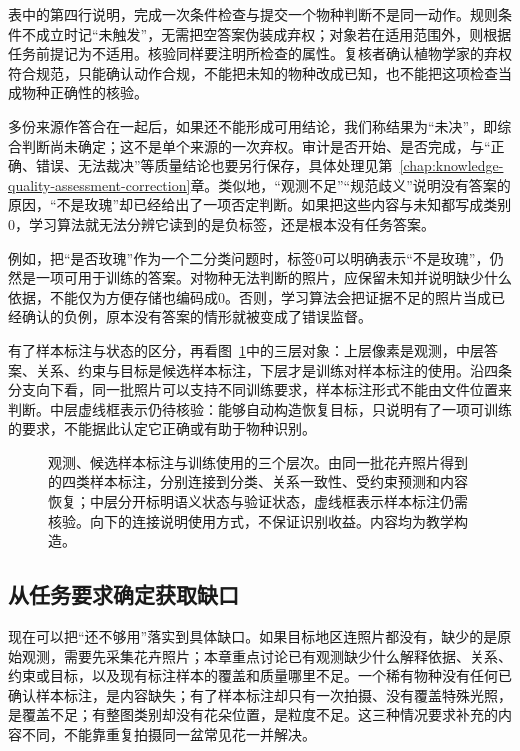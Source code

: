 表中的第四行说明，完成一次条件检查与提交一个物种判断不是同一动作。规则条件不成立时记“未触发”，无需把空答案伪装成弃权；对象若在适用范围外，则根据任务前提记为不适用。核验同样要注明所检查的属性。复核者确认植物学家的弃权符合规范，只能确认动作合规，不能把未知的物种改成已知，也不能把这项检查当成物种正确性的核验。

多份来源作答合在一起后，如果还不能形成可用结论，我们称结果为“未决”，即综合判断尚未确定；这不是单个来源的一次弃权。审计是否开始、是否完成，与“正确、错误、无法裁决”等质量结论也要另行保存，具体处理见第~\ref{chap:knowledge-quality-assessment-correction}章。类似地，“观测不足”“规范歧义”说明没有答案的原因，“不是玫瑰”却已经给出了一项否定判断。如果把这些内容与未知都写成类别0，学习算法就无法分辨它读到的是负标签，还是根本没有任务答案。

例如，把“是否玫瑰”作为一个二分类问题时，标签0可以明确表示“不是玫瑰”，仍然是一项可用于训练的答案。对物种无法判断的照片，应保留未知并说明缺少什么依据，不能仅为方便存储也编码成0。否则，学习算法会把证据不足的照片当成已经确认的负例，原本没有答案的情形就被变成了错误监督。

有了样本标注与状态的区分，再看图~\ref{fig:knowledge-acquisition-observation-to-knowledge}中的三层对象：上层像素是观测，中层答案、关系、约束与目标是候选样本标注，下层才是训练对样本标注的使用。沿四条分支向下看，同一批照片可以支持不同训练要求，样本标注形式不能由文件位置来判断。中层虚线框表示仍待核验：能够自动构造恢复目标，只说明有了一项可训练的要求，不能据此认定它正确或有助于物种识别。

\begin{figure}[htbp]
  \centering
  
  \caption{观测、候选样本标注与训练使用的三个层次。由同一批花卉照片得到的四类样本标注，分别连接到分类、关系一致性、受约束预测和内容恢复；中层分开标明语义状态与验证状态，虚线框表示样本标注仍需核验。向下的连接说明使用方式，不保证识别收益。内容均为教学构造。}
  \label{fig:knowledge-acquisition-observation-to-knowledge}
\end{figure}

\subsection{从任务要求确定获取缺口}
\label{sec:knowledge-acquisition-gap-diagnosis}

现在可以把“还不够用”落实到具体缺口。如果目标地区连照片都没有，缺少的是原始观测，需要先采集花卉照片；本章重点讨论已有观测缺少什么解释依据、关系、约束或目标，以及现有标注样本的覆盖和质量哪里不足。一个稀有物种没有任何已确认样本标注，是内容缺失；有了样本标注却只有一次拍摄、没有覆盖特殊光照，是覆盖不足；有整图类别却没有花朵位置，是粒度不足。这三种情况要求补充的内容不同，不能靠重复拍摄同一盆常见花一并解决。

